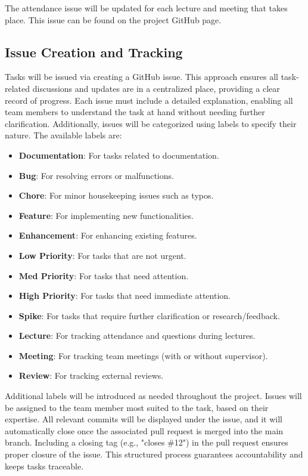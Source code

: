 \documentclass{article}
\begin{document}
The attendance issue will be updated for each lecture and meeting that takes place. This issue 
can be found on the project GitHub page.

\subsection{Issue Creation and Tracking}

Tasks will be issued via creating a GitHub issue. This approach ensures all task-related 
discussions and updates are in a centralized place, providing a clear record of progress. 
Each issue must include a detailed explanation, enabling all team members to understand the 
task at hand without needing further clarification. Additionally, issues will be categorized 
using labels to specify their nature. The available labels are:

\begin{itemize}
    \item \textbf{Documentation}: For tasks related to documentation.
    \item \textbf{Bug}: For resolving errors or malfunctions.
    \item \textbf{Chore}: For minor housekeeping issues such as typos.
    \item \textbf{Feature}: For implementing new functionalities.
    \item \textbf{Enhancement}: For enhancing existing features.
    \item \textbf{Low Priority}: For tasks that are not urgent.
    \item \textbf{Med Priority}: For tasks that need attention.
    \item \textbf{High Priority}: For tasks that need immediate attention.
    \item \textbf{Spike}: For tasks that require further clarification or research/feedback.
    \item \textbf{Lecture}: For tracking attendance and questions during lectures.
    \item \textbf{Meeting}: For tracking team meetings (with or without supervisor).
    \item \textbf{Review}: For tracking external reviews.
\end{itemize}

Additional labels will be introduced as needed throughout the project. Issues will be 
assigned to the team member most suited to the task, based on their expertise. All 
relevant commits will be displayed under the issue, and it will automatically close once 
the associated pull request is merged into the main branch. Including a closing tag (e.g., "closes \#12") 
in the pull request ensures proper closure of the issue. This structured process guarantees 
accountability and keeps tasks traceable.
\end{document}
